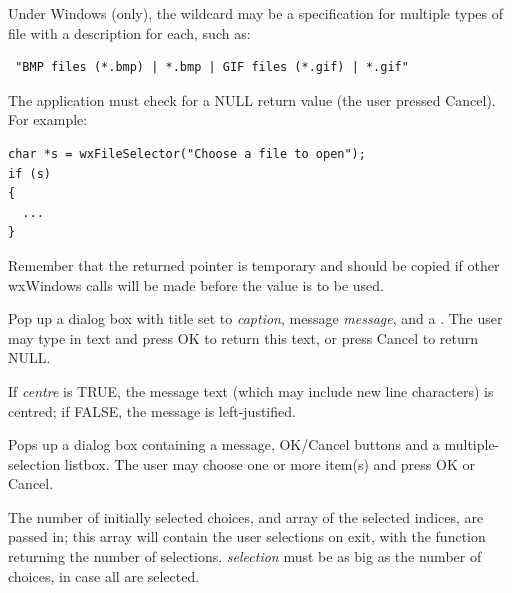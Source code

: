 Under Windows (only), the wildcard may be a specification for multiple
types of file with a description for each, such as:

\begin{verbatim}
 "BMP files (*.bmp) | *.bmp | GIF files (*.gif) | *.gif"
\end{verbatim}

The application must check for a NULL return value (the user pressed
Cancel). For example:

\begin{verbatim}
char *s = wxFileSelector("Choose a file to open");
if (s)
{
  ...
}
\end{verbatim}

Remember that the returned pointer is temporary and should be copied
if other wxWindows calls will be made before the value is to be used.

\label{wxgettextfromuser}


Pop up a dialog box with title set to {\it caption}, message {\it message}, and a
.  The user may type in text and press OK to return this text,
or press Cancel to return NULL.

If {\it centre} is TRUE, the message text (which may include new line characters)
is centred; if FALSE, the message is left-justified.

\label{wxgetmultiplechoice}


Pops up a dialog box containing a message, OK/Cancel buttons and a multiple-selection
listbox. The user may choose one or more item(s) and press OK or Cancel.

The number of initially selected choices, and array of the selected indices,
are passed in; this array will contain the user selections on exit, with
the function returning the number of selections. {\it selection} must be
as big as the number of choices, in case all are selected.

